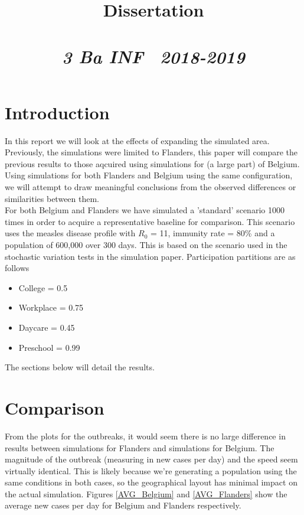 \documentclass{article}
\title{\textmd{\textbf{Dissertation}}\\\normalsize\vspace{0.1in}\Large{\assignmentname}\\\vspace{0.1in}\small{\textit{3 Ba INF \  2018-2019}}}
\author{\studentA}
\date{}
\begin{document}
\maketitle

\section{Introduction}
In this report we will look at the effects of expanding the simulated area. Previously, the simulations were limited to Flanders, this paper will compare the previous results to those aqcuired using simulations for (a large part) of Belgium. Using simulations for both Flanders and Belgium using the same configuration, we will attempt to draw meaningful conclusions from the observed differences or similarities between them. \\
For both Belgium and Flanders we have simulated a 'standard' scenario 1000 times in order to acquire a representative baseline for comparison. This scenario uses the measles disease profile with $R_0$ = 11, immunity rate = 80\% and a population of 600,000 over 300 days. This is based on the scenario used in the stochastic variation tests in the simulation paper. Participation partitions are as follows
\begin{itemize}
	\item College = 0.5
	\item Workplace = 0.75
	\item Daycare = 0.45
	\item Preschool = 0.99
\end{itemize} 
The sections below will detail the results.


\section{Comparison}
From the plots for the outbreaks, it would seem there is no large difference in results between simulations for Flanders and simulations for Belgium. The magnitude of the outbreak (measuring in new cases per day) and the speed seem virtually identical. This is likely because we're generating a population using the same conditions in both cases, so the geographical layout has minimal impact on the actual simulation. Figures \ref{AVG_Belgium} and \ref{AVG_Flanders} show the average new cases per day for Belgium and Flanders respectively.
\end{document}
